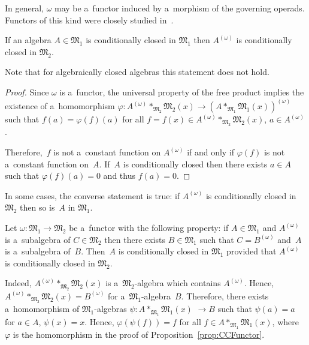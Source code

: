 \documentclass[pdftex]{sigma}
\begin{document}
In general, $\omega $ may be a~functor induced by a~morphism of the governing operads.
Functors of this kind were closely studied in~\cite{MikSh2013}.

\begin{proposition}
\label{prop:CCFunctor}
If an algebra $A\in \mathfrak M_1$ is conditionally closed in $\mathfrak M_1$ then $A^{(\omega)}$ is conditionally
closed in $\mathfrak M_2$.
\end{proposition}

Note that for algebraically closed algebras this statement does not hold.

\begin{proof}
Since $\omega $ is a~functor, the universal property of the free product implies the existence of a~homomorphism
$\varphi: A^{(\omega)}*_{\mathfrak M_2} \mathfrak M_2(x) \to (A*_{\mathfrak M_1} \mathfrak M_1(x))^{(\omega)} $ such
that $f(a)=\varphi(f)(a)$ for all $f=f(x)\in A^{(\omega)}*_{\mathfrak M_2} \mathfrak M_2(x)$, $a\in A^{(\omega)}$.

Therefore,~$f$ is not a~constant function on $A^{(\omega)}$ if and only if $\varphi(f)$ is not a~constant function
on~$A$.
If~$A$ is conditionally closed then there exists $a\in A$ such that $\varphi(f)(a)=0$ and thus $f(a)=0$.
\end{proof}

In some cases, the converse statement is true: if $A^{(\omega)}$ is conditionally closed in $\mathfrak M_2$ then so
is~$A$ in $\mathfrak M_1$.

\begin{remark}
\label{rem:CCAlgebras_const}
Let $\omega: \mathfrak M_1 \to \mathfrak M_2$ be a~functor with the following property: if $A\in \mathfrak M_1$ and
$A^{(\omega)}$ is a~subalgebra of $C\in \mathfrak M_2$ then there exists $B\in \mathfrak M_1$ such that $C=B^{(\omega)}$
and~$A$ is a~subalgebra of~$B$.
Then~$A$ is conditionally closed in $\mathfrak M_1$ provided that $A^{(\omega)}$ is conditionally closed in $\mathfrak
M_2$.
\end{remark}

Indeed, $A^{(\omega)}*_{\mathfrak M_2} \mathfrak M_2(x)$ is a~$\mathfrak M_2$-algebra which contains $A^{(\omega)}$.
Hence, $A^{(\omega)}*_{\mathfrak M_2} \mathfrak M_2(x) = B^{(\omega)}$ for a~$\mathfrak M_1$-algebra~$B$.
Therefore, there exists a~homomorphism of $\mathfrak M_1$-algebras  $\psi: A*_{\mathfrak M_1} \mathfrak M_1(x) $ $\to B $
such that $\psi(a)=a$ for $a\in A$, $\psi(x)=x$.
Hence, $\varphi(\psi(f)) = f $ for all $f\in A*_{\mathfrak M_1} \mathfrak M_1(x)$, where~$\varphi $ is the homomorphism
in the proof of Proposition~\ref{prop:CCFunctor}.
\end{document}
